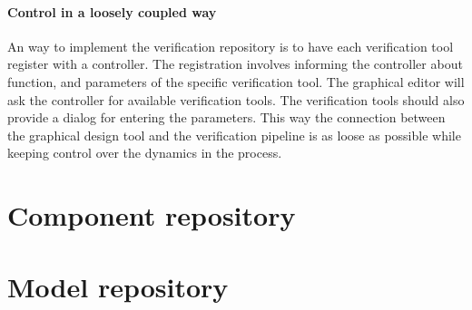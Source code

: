 \paragraph{Control in a loosely coupled way} An way to implement 
the verification repository is to have each verification tool register 
with a controller. The registration involves informing the controller
about function, and parameters of the specific verification tool. 
The graphical editor will ask the controller for available 
verification tools. The verification tools should also provide
a dialog for entering the parameters. This way the connection between 
the graphical design tool and the verification pipeline is as loose 
as possible while keeping control over the dynamics in the process.


\section{Component repository}


\section{Model repository}

